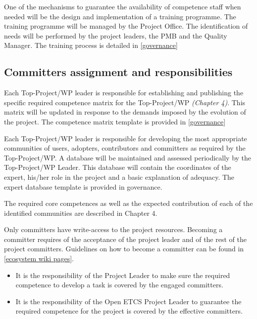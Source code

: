 \documentclass{template/openetcs_article}
\begin{document}
One of the mechanisms to guarantee the availability of competence staff when needed will be the design and implementation of a training programme. The training programme will be managed by the Project Office. The identification of needs will be performed by the project leaders, the PMB and the Quality Manager. 
The training process is detailed in \href{https://github.com/openETCS/governance/tree/master/Training%20Process}{[governance]}


\subsection{Committers assignment and responsibilities}

Each Top-Project/\gls{WP} leader is responsible for establishing and publishing the specific required competence matrix for the Top-Project/\gls{WP} \textit{(Chapter 4)}. This matrix will be updated in response to the demands imposed by the evolution of the project. The competence matrix template \citep{Competence}is provided in \href{https://github.com/openETCS/governance/tree/master/Templates}{[governance]}

Each Top-Project/\gls{WP} leader is responsible for developing the most appropriate communities of users, adopters, contributors and committers as required by the Top-Project/\gls{WP}. A database will be maintained and assessed periodically by the Top-Project/\gls{WP} Leader. This database will contain the coordinates of the expert, his/her role in the project and a basic explanation of adequacy. The expert database template is provided in governance.

The required core competences as well as the expected contribution of each of the identified communities are described in Chapter 4.

Only committers have write-access to the project resources. Becoming a committer requires of the acceptance of the project leader and of the rest of the project committers. Guidelines on how to become a committer can be found in \href{https://github.com/openETCS/ecosystem/wiki/_pages}{[ecosystem wiki pages]}.

\begin{itemize}
\item It is the responsibility of the Project Leader to make sure the required competence to develop a task is covered by the engaged committers.
\item It is the responsibility of the Open \gls{ETCS} Project Leader to guarantee the required competence for the project is covered by the effective committers.
\end{itemize}
\end{document}
